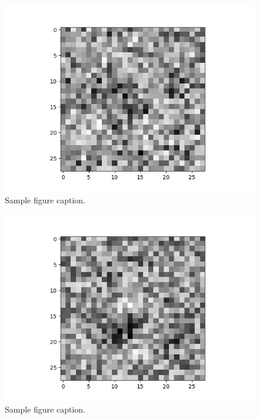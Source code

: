 \documentclass{article} %
\begin{document}
\begin{figure}[h]
\begin{center}
\includegraphics[width=0.8\linewidth]{2vs3-2vs8.png}
\end{center}
\caption{Sample figure caption.}
\end{figure}

\begin{figure}[h]
\begin{center}
\includegraphics[width=\linewidth]{2vs3.png}
\end{center}
\caption{Sample figure caption.}
\end{figure}
\end{document}
